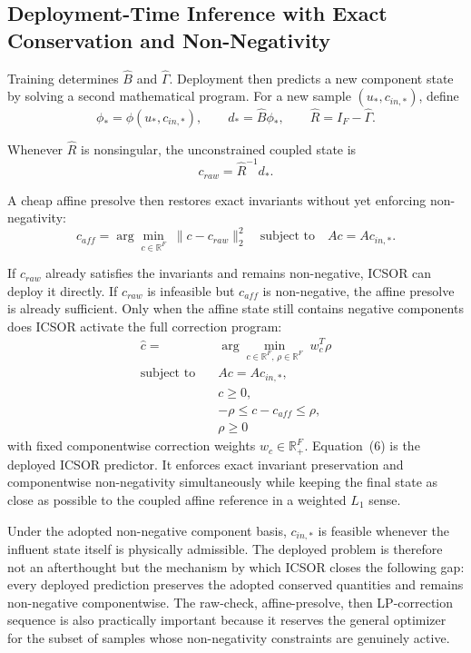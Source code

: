 \documentclass[11pt]{article}
\begin{document}
\subsection{Deployment-Time Inference with Exact Conservation and Non-Negativity}

Training determines $\widehat{B}$ and $\widehat{\Gamma}$. Deployment then predicts a new component state by solving a second mathematical program. For a new sample $(u_*, c_{in,*})$, define
\[
\phi_* = \phi(u_*, c_{in,*}), \qquad d_* = \widehat{B}\phi_*, \qquad \widehat{R} = I_F - \widehat{\Gamma}.
\]

Whenever $\widehat{R}$ is nonsingular, the unconstrained coupled state is
\[
c_{raw} = \widehat{R}^{-1} d_*.
\]

A cheap affine presolve then restores exact invariants without yet enforcing non-negativity:
\[
c_{aff} = \arg\min_{c \in \mathbb{R}^{F}} \; \|c - c_{raw}\|_2^2 \quad \text{subject to} \quad A c = A c_{in,*}.
\]

If $c_{raw}$ already satisfies the invariants and remains non-negative, ICSOR can deploy it directly. If $c_{raw}$ is infeasible but $c_{aff}$ is non-negative, the affine presolve is already sufficient. Only when the affine state still contains negative components does ICSOR activate the full correction program:
\begin{equation}
\begin{aligned}
\hat{c} = {}& \arg\min_{c \in \mathbb{R}^{F},\, \rho \in \mathbb{R}^{F}} \; w_c^T \rho \\
\text{subject to} \quad {}& A c = A c_{in,*}, \\
& c \ge 0, \\
& -\rho \le c - c_{aff} \le \rho, \\
& \rho \ge 0
\end{aligned}
\end{equation}
with fixed componentwise correction weights $w_c \in \mathbb{R}_{+}^{F}$. Equation~(6) is the deployed ICSOR predictor. It enforces exact invariant preservation and componentwise non-negativity simultaneously while keeping the final state as close as possible to the coupled affine reference in a weighted $L_1$ sense.

Under the adopted non-negative component basis, $c_{in,*}$ is feasible whenever the influent state itself is physically admissible. The deployed problem is therefore not an afterthought but the mechanism by which ICSOR closes the following gap: every deployed prediction preserves the adopted conserved quantities and remains non-negative componentwise. The raw-check, affine-presolve, then LP-correction sequence is also practically important because it reserves the general optimizer for the subset of samples whose non-negativity constraints are genuinely active.
\end{document}
